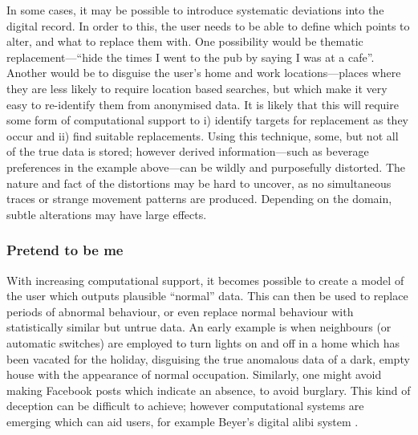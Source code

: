 \documentclass{IOS-Book-Article}     %
\newcommand{\tbox}[3][red]{{
\color{#1}\noindent{
   \fbox{\scriptsize{ {\bf #2} \textsl{#3}}}
   \vspace{2pt}
}
}}
\newcommand{\todo}[1]{\tbox{TODO:}{#1}}
\begin{document}
In some cases, it may be possible to introduce systematic deviations into the
digital record. In order to this, the user needs to be able to define which
points to alter, and what to replace them with. One possibility would be
thematic replacement---``hide the times I went to the pub by saying I
was at a cafe''. Another would be to disguise the user's home and work
locations---places where they are less likely to require location based
searches, but which make it very easy to re-identify them from anonymised data.
It is likely that this will require some form of computational support to i) identify targets for replacement as they occur and ii) find suitable replacements. Using this technique, some, but not all of the true data is stored; however derived information---such as beverage preferences in the
example above---can be wildly and purposefully distorted. The nature and fact of
the distortions may be hard to uncover, as no simultaneous traces or
strange movement patterns are produced. Depending on the domain, subtle
alterations may have large effects.
\todo{examples?}

\subsubsection{Pretend to be me}

With increasing computational support, it becomes possible to create a model of
the user which outputs plausible ``normal'' data. This can then be used to
replace periods of abnormal behaviour, or even replace normal behaviour with
statistically similar but untrue data. An early example is when neighbours (or
automatic switches) are employed to turn lights on and off in a home which has
been vacated for the holiday, disguising the true anomalous data of a dark,
empty house with the appearance of normal occupation. Similarly, one might avoid
making Facebook posts which indicate an absence, to avoid burglary. This kind of
deception can be difficult to achieve; however computational systems are
emerging which can aid users, for example Beyer's digital alibi system
\cite{beyer2014Alibi}.
\end{document}
